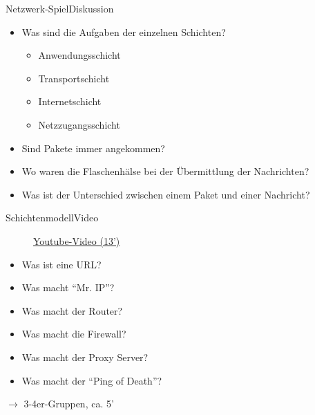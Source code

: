 \begin{frame}{Netzwerk-Spiel}{Diskussion}
    \begin{itemize}[<+->]
        \item Was sind die Aufgaben der einzelnen Schichten?
              \begin{itemize}
                  \item Anwendungsschicht
                  \item Transportschicht
                  \item Internetschicht
                  \item Netzzugangsschicht
              \end{itemize}
        \item Sind Pakete immer angekommen?
        \item Wo waren die Flaschenhälse bei der Übermittlung der Nachrichten?
        \item Was ist der Unterschied zwischen einem Paket und einer Nachricht?
    \end{itemize}
\end{frame}



\begin{frame}[fragile]{Schichtenmodell}{Video}
    \begin{figure}[H]
        \href{https://www.youtube.com/watch?v=PBWhzz_Gn10}{Youtube-Video (13')}
    \end{figure}

    \begin{myexercise}
        \begin{itemize}
            \item Was ist eine URL?
            \item Was macht \enquote{Mr. IP}?
            \item Was macht der Router?
            \item Was macht die Firewall?
            \item Was macht der Proxy Server?
            \item Was macht der \enquote{Ping of Death}? \faSkull
        \end{itemize}
        $\rightarrow$ 3-4er-Gruppen, ca. 5'
    \end{myexercise}
\end{frame}

